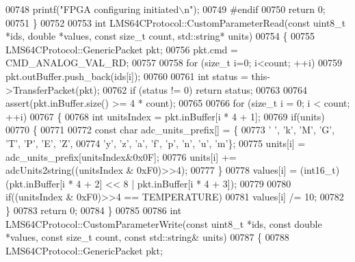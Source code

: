 \begin{DoxyCode}
{{{{{{{00748         printf(\textcolor{stringliteral}{"FPGA configuring initiated\(\backslash\)n"});
00749 \textcolor{preprocessor}{#endif}
00750     \textcolor{keywordflow}{return} 0;
00751 \}
00752 
00753 \textcolor{keywordtype}{int} LMS64CProtocol::CustomParameterRead(\textcolor{keyword}{const} uint8\_t *ids, \textcolor{keywordtype}{double} *values, \textcolor{keyword}{const} \textcolor{keywordtype}{size\_t} 
      count, std::string* units)
00754 \{
00755     LMS64CProtocol::GenericPacket pkt;
00756     pkt.cmd = CMD_ANALOG_VAL_RD;
00757 
00758     \textcolor{keywordflow}{for} (\textcolor{keywordtype}{size\_t} i=0; i<count; ++i)
00759         pkt.outBuffer.push\_back(ids[i]);
00760 
00761     \textcolor{keywordtype}{int} status = this->TransferPacket(pkt);
00762     \textcolor{keywordflow}{if} (status != 0) \textcolor{keywordflow}{return} status;
00763 
00764     assert(pkt.inBuffer.size() >= 4 * count);
00765 
00766     \textcolor{keywordflow}{for} (\textcolor{keywordtype}{size\_t} i = 0; i < count; ++i)
00767     \{
00768         \textcolor{keywordtype}{int} unitsIndex = pkt.inBuffer[i * 4 + 1];
00769         \textcolor{keywordflow}{if}(units)
00770         \{
00771 
00772             \textcolor{keyword}{const} \textcolor{keywordtype}{char} adc\_units\_prefix[] = \{
00773                 \textcolor{charliteral}{' '}, \textcolor{charliteral}{'k'}, \textcolor{charliteral}{'M'}, \textcolor{charliteral}{'G'}, \textcolor{charliteral}{'T'}, \textcolor{charliteral}{'P'}, \textcolor{charliteral}{'E'}, \textcolor{charliteral}{'Z'},
00774                 \textcolor{charliteral}{'y'}, \textcolor{charliteral}{'z'}, \textcolor{charliteral}{'a'}, \textcolor{charliteral}{'f'}, \textcolor{charliteral}{'p'}, \textcolor{charliteral}{'n'}, \textcolor{charliteral}{'u'}, \textcolor{charliteral}{'m'}\};
00775             units[i] = adc\_units\_prefix[unitsIndex&0x0F];
00776             units[i] += adcUnits2string((unitsIndex & 0xF0)>>4);
00777         \}
00778         values[i] = (int16\_t)(pkt.inBuffer[i * 4 + 2] << 8 | pkt.inBuffer[i * 4 + 3]);
00779 
00780         \textcolor{keywordflow}{if}((unitsIndex & 0xF0)>>4 == TEMPERATURE)
00781             values[i] /= 10;
00782     \}
00783     \textcolor{keywordflow}{return} 0;
00784 \}
00785 
00786 \textcolor{keywordtype}{int} LMS64CProtocol::CustomParameterWrite(\textcolor{keyword}{const} uint8\_t *ids, \textcolor{keyword}{const} \textcolor{keywordtype}{double} *values, \textcolor{keyword}{const} \textcolor{keywordtype}{size\_t} 
      count, \textcolor{keyword}{const} std::string& units)
00787 \{
00788     LMS64CProtocol::GenericPacket pkt;
}}}}}}}
\end{DoxyCode}
